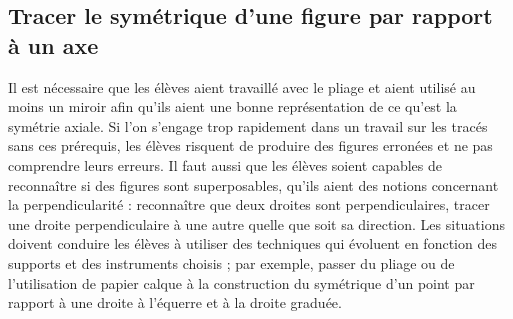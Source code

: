 \subsection{Tracer le symétrique d'une figure par rapport à un axe} %

Il est nécessaire que les élèves aient travaillé avec le pliage et aient utilisé au moins un miroir afin qu’ils aient une bonne représentation de ce qu’est la symétrie axiale. Si l’on s’engage trop rapidement dans un travail sur les tracés sans ces prérequis, les élèves risquent de produire des figures erronées et ne pas comprendre leurs erreurs. Il faut aussi que les élèves soient capables de reconnaître si des figures sont superposables, qu’ils aient des notions concernant la perpendicularité : reconnaître que deux droites sont perpendiculaires,  tracer une droite perpendiculaire à une autre quelle que soit sa direction. Les situations doivent conduire les élèves à utiliser des techniques qui évoluent en fonction des supports et des instruments choisis ; par exemple, passer du pliage ou de l’utilisation de papier calque à la construction du symétrique d’un point par rapport à une droite à l’équerre et à la droite graduée.
